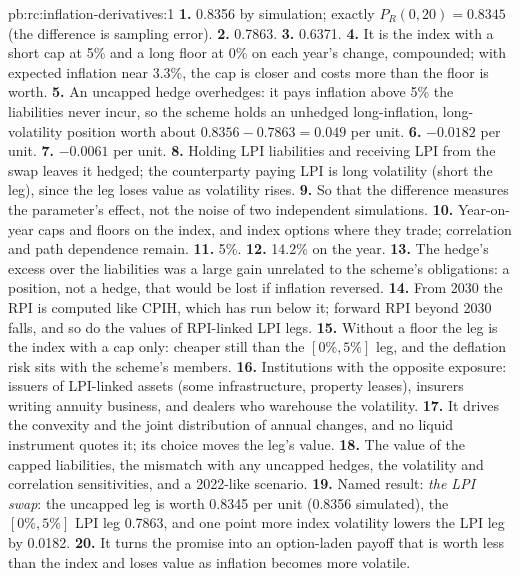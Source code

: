 \begin{solution}{pb:rc:inflation-derivatives:1}
\textbf{1.} 0.8356 by simulation; exactly $P_R(0,20) = 0.8345$ (the difference is sampling
error).
\textbf{2.} 0.7863.
\textbf{3.} 0.6371.
\textbf{4.} It is the index with a short cap at 5\% and a long floor at 0\% on each year's change,
compounded; with expected inflation near 3.3\%, the cap is closer and costs more than the
floor is worth.
\textbf{5.} An uncapped hedge overhedges: it pays inflation above 5\% the liabilities never
incur, so the scheme holds an unhedged long-inflation, long-volatility position worth about
$0.8356-0.7863 = 0.049$ per unit.
\textbf{6.} $-0.0182$ per unit.
\textbf{7.} $-0.0061$ per unit.
\textbf{8.} Holding LPI liabilities and receiving LPI from the swap leaves it hedged; the
counterparty paying LPI is long volatility (short the leg), since the leg loses value as
volatility rises.
\textbf{9.} So that the difference measures the parameter's effect, not the noise of two
independent simulations.
\textbf{10.} Year-on-year caps and floors on the index, and index options where they trade;
correlation and path dependence remain.
\textbf{11.} 5\%.
\textbf{12.} 14.2\% on the year.
\textbf{13.} The hedge's excess over the liabilities was a large gain unrelated to the scheme's
obligations: a position, not a hedge, that would be lost if inflation reversed.
\textbf{14.} From 2030 the RPI is computed like CPIH, which has run below it; forward RPI
beyond 2030 falls, and so do the values of RPI-linked LPI legs.
\textbf{15.} Without a floor the leg is the index with a cap only: cheaper still than the
$[0\%,5\%]$ leg, and the deflation risk sits with the scheme's members.
\textbf{16.} Institutions with the opposite exposure: issuers of LPI-linked assets (some
infrastructure, property leases), insurers writing annuity business, and dealers who warehouse
the volatility.
\textbf{17.} It drives the convexity and the joint distribution of annual changes, and no liquid
instrument quotes it; its choice moves the leg's value.
\textbf{18.} The value of the capped liabilities, the mismatch with any uncapped hedges, the
volatility and correlation sensitivities, and a 2022-like scenario.
\textbf{19.} Named result: \emph{the LPI swap}: the uncapped leg is worth 0.8345 per unit (0.8356
simulated), the $[0\%,5\%]$ LPI leg 0.7863, and one point more index volatility lowers the LPI leg by
0.0182.
\textbf{20.} It turns the promise into an option-laden payoff that is worth less than the index
and loses value as inflation becomes more volatile.
\end{solution}

